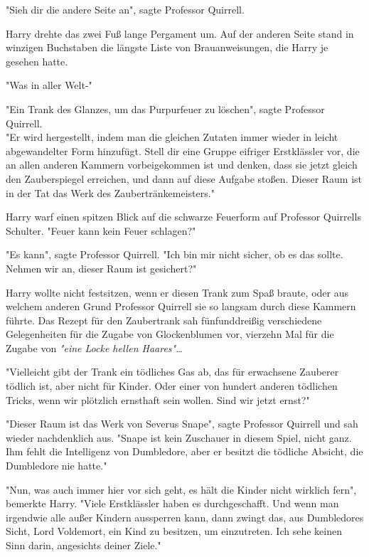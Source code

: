 {"Sieh dir die andere Seite an", sagte Professor Quirrell.

Harry drehte das zwei Fuß lange Pergament um. Auf der anderen Seite stand in winzigen Buchstaben die längste Liste von Brauanweisungen, die Harry je gesehen hatte.

"Was in aller Welt-"

"Ein Trank des Glanzes, um das Purpurfeuer zu löschen", sagte Professor Quirrell.\\ "Er wird hergestellt, indem man die gleichen Zutaten immer wieder in leicht abgewandelter Form hinzufügt. Stell dir eine Gruppe eifriger Erstklässler vor, die an allen anderen Kammern vorbeigekommen ist und denken, dass sie jetzt gleich den Zauberspiegel erreichen, und dann auf diese Aufgabe stoßen. Dieser Raum ist in der Tat das Werk des Zaubertränkemeisters."

Harry warf einen spitzen Blick auf die schwarze Feuerform auf Professor Quirrells Schulter. "Feuer kann kein Feuer schlagen?"

"Es kann", sagte Professor Quirrell. "Ich bin mir nicht sicher, ob es das sollte.\\ Nehmen wir an, dieser Raum ist gesichert?"

Harry wollte nicht festsitzen, wenn er diesen Trank zum Spaß braute, oder aus welchem anderen Grund Professor Quirrell sie so langsam durch diese Kammern führte. Das Rezept für den Zaubertrank sah fünfunddreißig verschiedene Gelegenheiten für die Zugabe von Glockenblumen vor, vierzehn Mal für die Zugabe von \emph{"eine Locke hellen Haares"}…

"Vielleicht gibt der Trank ein tödliches Gas ab, das für erwachsene Zauberer tödlich ist, aber nicht für Kinder. Oder einer von hundert anderen tödlichen Tricks, wenn wir plötzlich ernsthaft sein wollen. Sind wir jetzt ernst?"

"Dieser Raum ist das Werk von Severus Snape", sagte Professor Quirrell und sah wieder nachdenklich aus. "Snape ist kein Zuschauer in diesem Spiel, nicht ganz. Ihm fehlt die Intelligenz von Dumbledore, aber er besitzt die tödliche Absicht, die Dumbledore nie hatte."

"Nun, was auch immer hier vor sich geht, es hält die Kinder nicht wirklich fern", bemerkte Harry. "Viele Erstklässler haben es durchgeschafft. Und wenn man irgendwie alle außer Kindern aussperren kann, dann zwingt das, aus Dumbledores Sicht, Lord Voldemort, ein Kind zu besitzen, um einzutreten. Ich sehe keinen Sinn darin, angesichts deiner Ziele."

}

